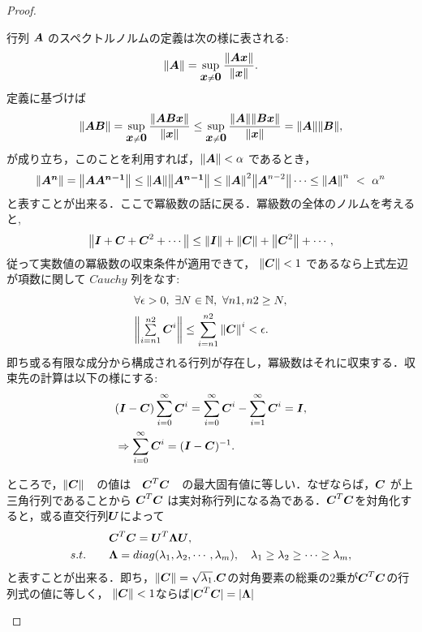 \documentclass[8pt]{jsarticle}
\newtheorem{proof}{証明}
\def\vector#1{\mbox{\boldmath $#1$}}
\def\norm#1{\mbox{$\left\| #1 \right\|$}}
\begin{document}
\begin{proof}
\begin{breakbox}
	行列 $\vector{A}$ のスペクトルノルムの定義は次の様に表される:
	\[
		\norm{\vector{A}} = \sup_{\vector{x} \neq \vector{0}} \frac{\norm{\vector{Ax}}}{\norm{\vector{x}}}.
	\]
	定義に基づけば
	\[
		\norm{\vector{AB}} = \sup_{\vector{x} \neq \vector{0}} \frac{\norm{\vector{ABx}}}{\norm{\vector{x}}} \leq \sup_{\vector{x} \neq \vector{0}} \frac{\norm{\vector{A}}\norm{\vector{Bx}}}{\norm{\vector{x}}}
		= \norm{\vector{A}}\norm{\vector{B}},
	\]
	が成り立ち，このことを利用すれば，$\norm{\vector{A}} < \alpha$ であるとき，
	\[
		\norm{\vector{A^n}} = \norm{\vector{AA^{n-1}}} 
		\leq \norm{\vector{A}}\norm{\vector{A^{n-1}}}
		\leq \norm{\vector{A}}^2 \norm{\vector{A}^{n-2}} \cdots \leq \norm{\vector{A}}^n \ <\ \alpha^n
	\]
	と表すことが出来る．ここで冪級数の話に戻る．冪級数の全体のノルムを考えると,
	\[
		\norm{\vector{I} + \vector{C} + \vector{C}^2 + \cdots } \leq \norm{\vector{I}} + \norm{\vector{C}} + \norm{\vector{C}^2} + \cdots, 
	\]
	従って実数値の冪級数の収束条件が適用できて， $\norm{\vector{C}} < 1$ であるなら上式左辺が項数に関して $Cauchy$ 列をなす:
	\begin{align*}
		&\forall \epsilon > 0,\ \exists N \in \mathbb{N},\ \forall n1,n2 \geq N, \\
		&\norm{\sum\limits_{i=n1}^{n2} \vector{C}^i} \leq \sum_{i=n1}^{n2} \norm{\vector{C}}^i < \epsilon.
	\end{align*}
	即ち或る有限な成分から構成される行列が存在し，冪級数はそれに収束する．収束先の計算は以下の様にする:
	\begin{align*}
		&(\vector{I} - \vector{C})\sum_{i=0}^{\infty} \vector{C}^i = \sum_{i=0}^{\infty} \vector{C}^i - \sum_{i=1}^{\infty} \vector{C}^i = \vector{I}, \\
		&\Rightarrow \sum_{i=0}^{\infty} \vector{C}^i = (\vector{I} - \vector{C})^{-1}.
	\end{align*}
	
	ところで，$\norm{\vector{C}}$　の値は　$\vector{C}^{T}\vector{C}$　の最大固有値に等しい．なぜならば，$\vector{C}$ が上三角行列であることから 
	$\vector{C}^{T}\vector{C}$ は実対称行列になる為である．$\vector{C}^{T}\vector{C}$を対角化すると，或る直交行列$\vector{U}$によって
	\begin{align*}
		&\vector{C}^{T}\vector{C} = \vector{U}^{T}\vector{\Lambda}\vector{U}, \\
		s.t. \qquad &\vector{\Lambda} = diag(\lambda_1, \lambda_2, \cdots, \lambda_m), \quad \lambda_1 \geq \lambda_2 \geq \cdots \geq \lambda_m,
	\end{align*}
	と表すことが出来る．即ち，$\norm{\vector{C}} = \sqrt{\lambda_1}$.$\vector{C}$の対角要素の総乗の$2$乗が$\vector{C}^{T}\vector{C}$の行列式の値に等しく，
	$\norm{\vector{C}} < 1$ならば$| \vector{C}^{T}\vector{C} | = | \vector{\Lambda} |$
	\[
		
\]
\end{breakbox}
\end{proof}
\end{document}
